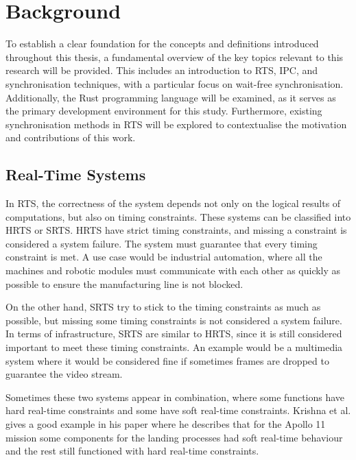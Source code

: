 \chapter{Background}\label{ch:background}

To establish a clear foundation for the concepts and definitions introduced throughout this thesis, a fundamental overview of the key topics relevant to this research will be provided. This includes an introduction to \ac{RTS}, \acf{IPC}, and synchronisation techniques, with a particular focus on wait-free synchronisation. Additionally, the Rust programming language will be examined, as it serves as the primary development environment for this study. Furthermore, existing synchronisation methods in \ac{RTS} will be explored to contextualise the motivation and contributions of this work.

\section{Real-Time Systems}\label{sec:real-time}

In \ac{RTS}, the correctness of the system depends not only on the logical results of computations, but also on timing constraints. These systems can be classified into \ac{HRTS} or \ac{SRTS}. \ac{HRTS} have strict timing constraints, and missing a constraint is considered a system failure. The system must guarantee that every timing constraint is met. A use case would be industrial automation, where all the machines and robotic modules must communicate with each other as quickly as possible to ensure the manufacturing line is not blocked. \cite{HardSoftRealTime}

On the other hand, \ac{SRTS} try to stick to the timing constraints as much as possible, but missing some timing constraints is not considered a system failure. In terms of infrastructure, \ac{SRTS} are similar to \ac{HRTS}, since it is still considered important to meet these timing constraints. An example would be a multimedia system where it would be considered fine if sometimes frames are dropped to guarantee the video stream. \cite{HardSoftRealTime}

Sometimes these two systems appear in combination, where some functions have hard real-time constraints and some have soft real-time constraints. Krishna et al. gives a good example in his paper where he describes that for the Apollo 11 mission some components for the landing processes had soft real-time behaviour and the rest still functioned with hard real-time constraints. \cite{HardSoftRealTime}

